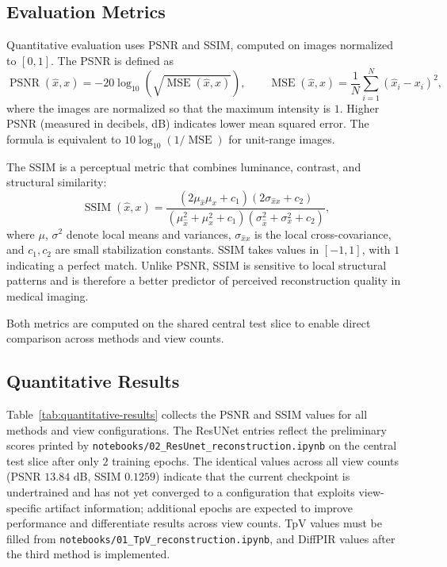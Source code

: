 \documentclass[11pt,a4paper]{article}
\begin{document}
\subsection{Evaluation Metrics}

Quantitative evaluation uses PSNR and SSIM, computed on images normalized to
$[0,1]$. The PSNR is defined as
\begin{equation}
  \operatorname{PSNR}(\widehat{x},x)
  =
  -20\log_{10}
  \!\left(
  \sqrt{\operatorname{MSE}(\widehat{x},x)}
  \right),
  \qquad
  \operatorname{MSE}(\widehat{x},x)
  =
  \frac{1}{N}
  \sum_{i=1}^{N}
  (\widehat{x}_i - x_i)^2,
  \label{eq:psnr}
\end{equation}
where the images are normalized so that the maximum intensity is $1$. Higher
PSNR (measured in decibels, dB) indicates lower mean squared error. The
formula is equivalent to $10\log_{10}(1/\operatorname{MSE})$ for unit-range
images.

The SSIM \cite{wang2004ssim} is a perceptual metric that combines luminance,
contrast, and structural similarity:
\begin{equation}
  \operatorname{SSIM}(\widehat{x},x)
  =
  \frac{(2\mu_{\widehat{x}}\mu_x + c_1)(2\sigma_{\widehat{x}x} + c_2)}
       {(\mu_{\widehat{x}}^2 + \mu_x^2 + c_1)(\sigma_{\widehat{x}}^2 + \sigma_x^2 + c_2)},
  \label{eq:ssim}
\end{equation}
where $\mu$, $\sigma^2$ denote local means and variances, $\sigma_{\widehat{x}x}$
is the local cross-covariance, and $c_1, c_2$ are small stabilization
constants. SSIM takes values in $[-1,1]$, with $1$ indicating a perfect match.
Unlike PSNR, SSIM is sensitive to local structural patterns and is therefore a
better predictor of perceived reconstruction quality in medical imaging.

Both metrics are computed on the shared central test slice to enable direct
comparison across methods and view counts.

\subsection{Quantitative Results}

Table~\ref{tab:quantitative-results} collects the PSNR and SSIM values for all
methods and view configurations. The ResUNet entries reflect the preliminary
scores printed by \texttt{notebooks/02\_ResUnet\_reconstruction.ipynb} on the
central test slice after only $2$ training epochs. The identical values across
all view counts (PSNR $13.84$ dB, SSIM $0.1259$) indicate that the current
checkpoint is undertrained and has not yet converged to a configuration that
exploits view-specific artifact information; additional epochs are expected to
improve performance and differentiate results across view counts. TpV values
must be filled from \texttt{notebooks/01\_TpV\_reconstruction.ipynb}, and
DiffPIR values after the third method is implemented.
\end{document}
